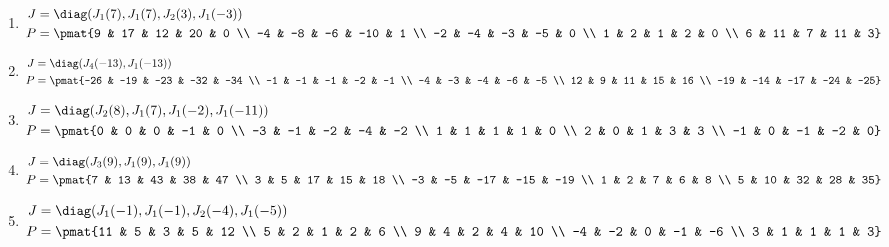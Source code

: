 \begin{enumerate}
\item

\begin{align*}
J &= \diag(J_{1}(7), J_{1}(7), J_{2}(3), J_{1}(-3))\\
P &= \pmat{9 & 17 & 12 & 20 & 0 \\ -4 & -8 & -6 & -10 & 1 \\ -2 & -4 & -3 & -5 & 0 \\ 1 & 2 & 1 & 2 & 0 \\ 6 & 11 & 7 & 11 & 3}
\end{align*}

\item

\begin{align*}
J &= \diag(J_{4}(-13), J_{1}(-13))\\
P &= \pmat{-26 & -19 & -23 & -32 & -34 \\ -1 & -1 & -1 & -2 & -1 \\ -4 & -3 & -4 & -6 & -5 \\ 12 & 9 & 11 & 15 & 16 \\ -19 & -14 & -17 & -24 & -25}
\end{align*}

\item

\begin{align*}
J &= \diag(J_{2}(8), J_{1}(7), J_{1}(-2), J_{1}(-11))\\
P &= \pmat{0 & 0 & 0 & -1 & 0 \\ -3 & -1 & -2 & -4 & -2 \\ 1 & 1 & 1 & 1 & 0 \\ 2 & 0 & 1 & 3 & 3 \\ -1 & 0 & -1 & -2 & 0}
\end{align*}

\item

\begin{align*}
J &= \diag(J_{3}(9), J_{1}(9), J_{1}(9))\\
P &= \pmat{7 & 13 & 43 & 38 & 47 \\ 3 & 5 & 17 & 15 & 18 \\ -3 & -5 & -17 & -15 & -19 \\ 1 & 2 & 7 & 6 & 8 \\ 5 & 10 & 32 & 28 & 35}
\end{align*}

\item

\begin{align*}
J &= \diag(J_{1}(-1), J_{1}(-1), J_{2}(-4), J_{1}(-5))\\
P &= \pmat{11 & 5 & 3 & 5 & 12 \\ 5 & 2 & 1 & 2 & 6 \\ 9 & 4 & 2 & 4 & 10 \\ -4 & -2 & 0 & -1 & -6 \\ 3 & 1 & 1 & 1 & 3}
\end{align*}


\end{enumerate}
